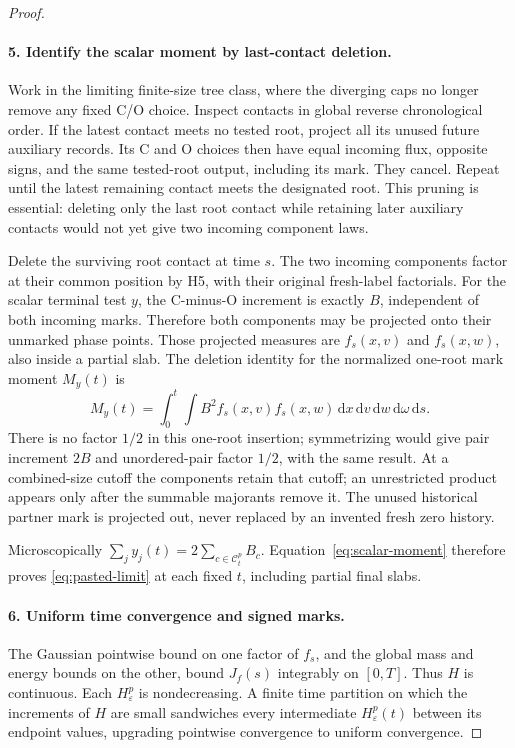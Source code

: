 \documentclass[11pt,letterpaper]{article}
\numberwithin{equation}{section}
\theoremstyle{definition}\newtheorem{assumption}[theorem]{Assumption}
\theoremstyle{remark}\newtheorem{remark}[theorem]{Remark}
\newcommand{\eps}{\varepsilon}\newcommand{\dd}{\,\mathrm d}
\begin{document}
\begin{proof}
\paragraph{5. Identify the scalar moment by last-contact deletion.}
Work in the limiting finite-size tree class, where the diverging caps no longer remove any fixed C/O choice. Inspect contacts in global reverse chronological order. If the latest contact meets no tested root, project all its unused future auxiliary records. Its C and O choices then have equal incoming flux, opposite signs, and the same tested-root output, including its mark. They cancel. Repeat until the latest remaining contact meets the designated root. This pruning is essential: deleting only the last root contact while retaining later auxiliary contacts would not yet give two incoming component laws.

Delete the surviving root contact at time $s$. The two incoming components factor at their common position by H5, with their original fresh-label factorials. For the scalar terminal test $y$, the C-minus-O increment is exactly $B$, independent of both incoming marks. Therefore both components may be projected onto their unmarked phase points. Those projected measures are $f_s(x,v)$ and $f_s(x,w)$, also inside a partial slab. The deletion identity for the normalized one-root mark moment $M_y(t)$ is
\begin{equation}\label{eq:scalar-moment}
 M_y(t)=\int_0^t\int B^2 f_s(x,v)f_s(x,w)\dd x\dd v\dd w\dd\omega\dd s.
\end{equation}
There is no factor $1/2$ in this one-root insertion; symmetrizing would give pair increment $2B$ and unordered-pair factor $1/2$, with the same result. At a combined-size cutoff the components retain that cutoff; an unrestricted product appears only after the summable majorants remove it. The unused historical partner mark is projected out, never replaced by an invented fresh zero history.

Microscopically $\sum_j y_j(t)=2\sum_{c\in\mathcal C_t^p}B_c$. Equation~\eqref{eq:scalar-moment} therefore proves \eqref{eq:pasted-limit} at each fixed $t$, including partial final slabs.

\paragraph{6. Uniform time convergence and signed marks.}
The Gaussian pointwise bound on one factor of $f_s$, and the global mass and energy bounds on the other, bound $J_f(s)$ integrably on $[0,T]$. Thus $H$ is continuous. Each $H_\eps^p$ is nondecreasing. A finite time partition on which the increments of $H$ are small sandwiches every intermediate $H_\eps^p(t)$ between its endpoint values, upgrading pointwise convergence to uniform convergence.


\end{proof}
\end{document}
